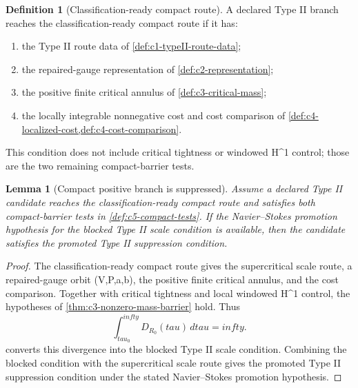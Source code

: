 \documentclass[11pt]{amsart}
\def\({}%
\def\){}%
\def\tilde#1{#1}%
\def\mathfrak#1{#1}%
\def\tau{tau}%
\def\infty{infty}%
\theoremstyle{plain}
\newtheorem{lemma}[theorem]{Lemma}
\theoremstyle{definition}
\newtheorem{definition}[theorem]{Definition}
\theoremstyle{remark}
\begin{document}
\begin{definition}[Classification-ready compact route]
\label{def:c5-class-complete}
A declared Type II branch reaches the classification-ready compact route if
it has:
\begin{enumerate}[label=\textup{(\roman*)}]
\item the Type II route data of \cref{def:c1-typeII-route-data};
\item the repaired-gauge representation of \cref{def:c2-representation};
\item the positive finite critical annulus of \cref{def:c3-critical-mass};
\item the locally integrable nonnegative cost and cost comparison of
\cref{def:c4-localized-cost,def:c4-cost-comparison}.
\end{enumerate}
This condition does not include critical tightness or windowed \(H^1\) control;
those are the two remaining compact-barrier tests.
\end{definition}

\begin{lemma}[Compact positive branch is suppressed]
\label{lem:c5-compact-positive-suppressed}
Assume a declared Type II candidate reaches the classification-ready compact
route and satisfies both compact-barrier tests in \cref{def:c5-compact-tests}.
If the Navier--Stokes promotion hypothesis for the blocked Type II scale
condition is available, then the candidate satisfies the promoted Type II
suppression condition.
\end{lemma}

\begin{proof}
The classification-ready compact route gives the supercritical scale route,
a repaired-gauge orbit \((V,P,a,b)\), the positive finite critical annulus, and
the cost comparison.  Together with critical tightness and local windowed
\(H^1\) control, the hypotheses of \cref{thm:c3-nonzero-mass-barrier} hold.
Thus
\[
  \int_{\tau_0}^{\infty}
  \tilde{\mathfrak D}_{R_0}(\tau)\,d\tau=\infty.
\]
 converts this divergence into the blocked Type II
scale condition.  Combining the blocked condition with the supercritical scale
route gives the promoted Type II suppression condition under the stated
Navier--Stokes promotion hypothesis.
\end{proof}
\end{document}
